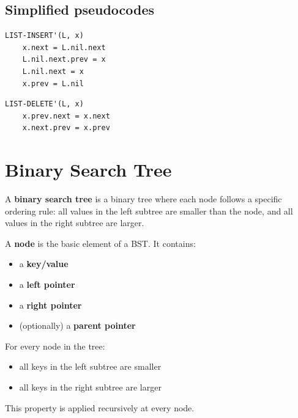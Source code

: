 \documentclass[11pt,a4paper,openany]{book}
\begin{document}
\section{Simplified pseudocodes}

\begin{lstlisting}
LIST-INSERT'(L, x)
    x.next = L.nil.next
    L.nil.next.prev = x
    L.nil.next = x
    x.prev = L.nil
\end{lstlisting}

\begin{lstlisting}
LIST-DELETE'(L, x)
    x.prev.next = x.next
    x.next.prev = x.prev
\end{lstlisting}







\vspace{2cm}






\chapter{Binary Search Tree}

\begin{defnbox}[title=Binary Search Tree (BST)]
A \textbf{binary search tree} is a binary tree where each node follows a specific ordering rule:
all values in the left subtree are smaller than the node, and all values in the right subtree are larger.
\end{defnbox}

\begin{defnbox}[title=Node]
A \textbf{node} is the basic element of a BST.  
It contains:
\begin{itemize}
    \item a \textbf{key/value}
    \item a \textbf{left pointer}
    \item a \textbf{right pointer}
    \item (optionally) a \textbf{parent pointer}
\end{itemize}
\end{defnbox}


\begin{defnbox}[title=BST property]
For every node in the tree:
\begin{itemize}
    \item all keys in the left subtree are smaller
    \item all keys in the right subtree are larger
\end{itemize}
This property is applied recursively at every node.
\end{defnbox}
\end{document}
